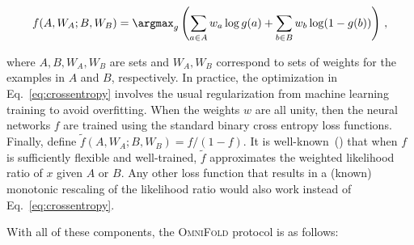 \documentclass{article} %
\begin{document}
  \begin{align}
  \label{eq:crossentropy}
 f(A,W_A;B,W_B) = \argmax_{g}\left( \sum_{a\in A} w_a\log g(a)+ \sum_{b\in B} w_b\log(1-g(b))\right)\,,
 \end{align}
 
 where $A,B,W_A,W_B$ are sets and $W_A, W_B$ correspond to sets of weights for the examples in $A$ and $B$, respectively.  In practice, the optimization in Eq.~\ref{eq:crossentropy} involves the usual regularization from machine learning training to avoid overfitting.  When the weights $w$ are all unity, then the neural networks $f$ are trained using the standard binary cross entropy loss functions.  Finally, define $\tilde{f}(A,W_A;B,W_B)=f/(1-f)$.  It is well-known~(\cite{hastie01statisticallearning,sugiyama_suzuki_kanamori_2012}) that when $f$ is sufficiently flexible and well-trained, $\tilde{f}$ approximates the weighted likelihood ratio of $x$ given $A$ or $B$.  Any other loss function that results in a (known) monotonic rescaling of the likelihood ratio would also work instead of Eq.~\ref{eq:crossentropy}. 

 
 With all of these components, the \textsc{OmniFold} protocol is as follows:
 
\end{document}
